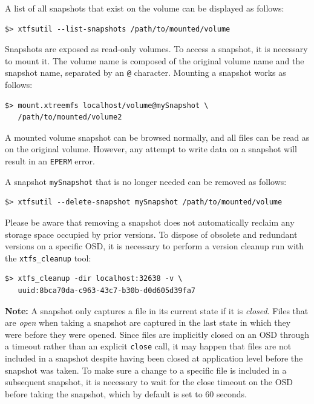 \documentclass[a4paper,10pt]{book}
\begin{document}
A list of all snapshots that exist on the volume can be displayed as follows:

\begin{verbatim}
$> xtfsutil --list-snapshots /path/to/mounted/volume
\end{verbatim}

Snapshots are exposed as read-only volumes. To access a snapshot, it is necessary to mount it. The volume name is composed of the original volume name and the snapshot name, separated by an \texttt{@} character. Mounting a snapshot works as follows:

\begin{verbatim}
$> mount.xtreemfs localhost/volume@mySnapshot \
   /path/to/mounted/volume2
\end{verbatim}

A mounted volume snapshot can be browsed normally, and all files can be read as on the original volume. However, any attempt to write data on a snapshot will result in an \texttt{EPERM} error.

A snapshot \texttt{mySnapshot} that is no longer needed can be removed as follows:

\begin{verbatim}
$> xtfsutil --delete-snapshot mySnapshot /path/to/mounted/volume
\end{verbatim}

Please be aware that removing a snapshot does not automatically reclaim any storage space occupied by prior versions. To dispose of obsolete and redundant versions on a specific OSD, it is necessary to perform a version cleanup run with the \texttt{xtfs\_cleanup} tool:

\begin{verbatim}
$> xtfs_cleanup -dir localhost:32638 -v \
   uuid:8bca70da-c963-43c7-b30b-d0d605d39fa7
\end{verbatim}

\textbf{Note:} A snapshot only captures a file in its current state if it is \emph{closed}. Files that are \emph{open} when taking a snapshot are captured in the last state in which they were before they were opened. Since files are implicitly closed on an OSD through a timeout rather than an explicit \texttt{close} call, it may happen that files are not included in a snapshot despite having been closed at application level before the snapshot was taken. To make sure a change to a specific file is included in a subsequent snapshot, it is necessary to wait for the close timeout on the OSD before taking the snapshot, which by default is set to 60 seconds.
\end{document}
